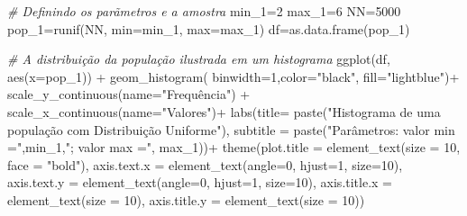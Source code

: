 \documentclass[
]{book}
\newenvironment{Shaded}{\begin{snugshade}}{\end{snugshade}}
\newcommand{\AttributeTok}[1]{\textcolor[rgb]{0.77,0.63,0.00}{#1}}
\newcommand{\CommentTok}[1]{\textcolor[rgb]{0.56,0.35,0.01}{\textit{#1}}}
\newcommand{\DecValTok}[1]{\textcolor[rgb]{0.00,0.00,0.81}{#1}}
\newcommand{\FunctionTok}[1]{\textcolor[rgb]{0.00,0.00,0.00}{#1}}
\newcommand{\NormalTok}[1]{#1}
\newcommand{\OtherTok}[1]{\textcolor[rgb]{0.56,0.35,0.01}{#1}}
\newcommand{\SpecialCharTok}[1]{\textcolor[rgb]{0.00,0.00,0.00}{#1}}
\newcommand{\StringTok}[1]{\textcolor[rgb]{0.31,0.60,0.02}{#1}}
\begin{document}
\begin{Shaded}
\begin{Highlighting}[]
\CommentTok{\# Definindo os parãmetros e a amostra}
\NormalTok{min\_1}\OtherTok{=}\DecValTok{2}
\NormalTok{max\_1}\OtherTok{=}\DecValTok{6}
\NormalTok{NN}\OtherTok{=}\DecValTok{5000}
\NormalTok{pop\_1}\OtherTok{=}\FunctionTok{runif}\NormalTok{(NN, }\AttributeTok{min=}\NormalTok{min\_1, }\AttributeTok{max=}\NormalTok{max\_1)}
\NormalTok{df}\OtherTok{=}\FunctionTok{as.data.frame}\NormalTok{(pop\_1)}

\CommentTok{\# A distribuição da população ilustrada em um histograma}
\FunctionTok{ggplot}\NormalTok{(df, }\FunctionTok{aes}\NormalTok{(}\AttributeTok{x=}\NormalTok{pop\_1)) }\SpecialCharTok{+} 
  \FunctionTok{geom\_histogram}\NormalTok{( }\AttributeTok{binwidth=}\DecValTok{1}\NormalTok{,}\AttributeTok{color=}\StringTok{"black"}\NormalTok{, }\AttributeTok{fill=}\StringTok{"lightblue"}\NormalTok{)}\SpecialCharTok{+}
  \FunctionTok{scale\_y\_continuous}\NormalTok{(}\AttributeTok{name=}\StringTok{"Frequência"}\NormalTok{) }\SpecialCharTok{+}
  \FunctionTok{scale\_x\_continuous}\NormalTok{(}\AttributeTok{name=}\StringTok{"Valores"}\NormalTok{)}\SpecialCharTok{+}
  \FunctionTok{labs}\NormalTok{(}\AttributeTok{title=} \FunctionTok{paste}\NormalTok{(}\StringTok{"Histograma de uma população com Distribuição Uniforme"}\NormalTok{), }
       \AttributeTok{subtitle =} \FunctionTok{paste}\NormalTok{(}\StringTok{"Parâmetros: valor min ="}\NormalTok{,min\_1,}\StringTok{"; valor max ="}\NormalTok{, max\_1))}\SpecialCharTok{+}
  \FunctionTok{theme}\NormalTok{(}\AttributeTok{plot.title =} \FunctionTok{element\_text}\NormalTok{(}\AttributeTok{size =} \DecValTok{10}\NormalTok{, }\AttributeTok{face =} \StringTok{"bold"}\NormalTok{),}
        \AttributeTok{axis.text.x =} \FunctionTok{element\_text}\NormalTok{(}\AttributeTok{angle=}\DecValTok{0}\NormalTok{, }\AttributeTok{hjust=}\DecValTok{1}\NormalTok{, }\AttributeTok{size=}\DecValTok{10}\NormalTok{),}
        \AttributeTok{axis.text.y =} \FunctionTok{element\_text}\NormalTok{(}\AttributeTok{angle=}\DecValTok{0}\NormalTok{, }\AttributeTok{hjust=}\DecValTok{1}\NormalTok{, }\AttributeTok{size=}\DecValTok{10}\NormalTok{),}
        \AttributeTok{axis.title.x =} \FunctionTok{element\_text}\NormalTok{(}\AttributeTok{size =} \DecValTok{10}\NormalTok{),}
        \AttributeTok{axis.title.y =} \FunctionTok{element\_text}\NormalTok{(}\AttributeTok{size =} \DecValTok{10}\NormalTok{))}
\end{Highlighting}
\end{Shaded}
\end{document}
